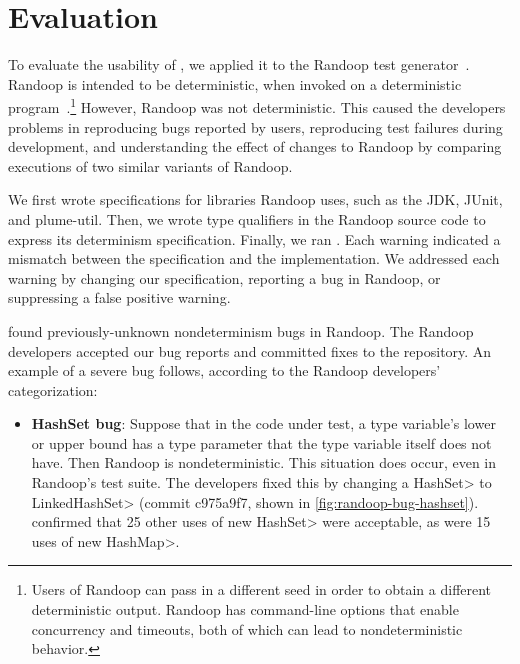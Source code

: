 \section{Evaluation\label{sec:results}}
To evaluate the usability of \theDeterminismChecker,
we applied it to the Randoop test
generator~\cite{PachecoLEB2007}.
Randoop is intended to be deterministic, when invoked on a deterministic
program~\cite{randoop-manual}.\footnote{Users of Randoop can pass in a different seed in order to
    obtain a different deterministic output.  Randoop has command-line
    options that enable concurrency and timeouts, both of which can lead to
    nondeterministic behavior.}
However, Randoop was not deterministic.  This caused the developers
problems in 
reproducing bugs reported by users, 
reproducing test failures during development, and
understanding the effect of changes to Randoop by comparing executions of two
similar variants of Randoop.

We first wrote specifications for libraries Randoop uses, such as the JDK,
JUnit, and plume-util.
Then, we wrote type qualifiers in the Randoop source code to express its
determinism specification.
Finally, we ran
\theDeterminismChecker.  Each warning indicated a mismatch between the
specification and the implementation.  We addressed each warning by changing our
specification, reporting a bug in Randoop, or suppressing a false positive warning.

\TheDeterminismChecker found \numRandoopBugs previously-unknown nondeterminism bugs in Randoop.
The Randoop developers accepted our bug reports and committed fixes to the repository. An example
of a severe bug follows, according to the Randoop developers' categorization:

\begin{itemize}
    \item
    \textbf{HashSet bug}: Suppose that in the code under test, a type variable's lower or upper
    bound has a type parameter that the type variable itself does not have. Then Randoop is nondeterministic.
    This situation does occur, even in Randoop's test suite.
    The developers fixed this by changing a \<HashSet> to \<LinkedHashSet>
    (commit c975a9f7, shown in \cref{fig:randoop-bug-hashset}).
    \TheDeterminismChecker confirmed that 
    25 other uses of \<new HashSet> were acceptable, as were 15 uses of \<new HashMap>.
\end{itemize}

